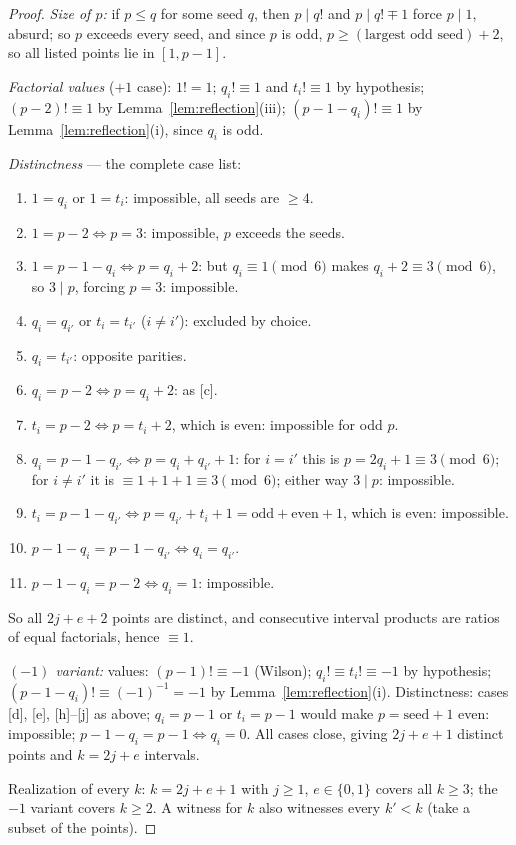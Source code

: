 \documentclass[11pt]{article}
\theoremstyle{definition}
\theoremstyle{remark}
\begin{document}
\begin{proof}
\emph{Size of $p$:} if $p \le q$ for some seed $q$, then $p \mid q!$ and
$p \mid q! \mp 1$ force $p \mid 1$, absurd; so $p$ exceeds every seed, and
since $p$ is odd, $p \ge (\text{largest odd seed}) + 2$, so all listed points
lie in $[1, p-1]$.

\emph{Factorial values} ($+1$ case): $1! = 1$; $q_i! \equiv 1$ and
$t_i! \equiv 1$ by hypothesis; $(p-2)! \equiv 1$ by
Lemma~\ref{lem:reflection}(iii); $(p-1-q_i)! \equiv 1$ by
Lemma~\ref{lem:reflection}(i), since $q_i$ is odd.

\emph{Distinctness} --- the complete case list:
\begin{enumerate}
  \item[{[a]}] $1 = q_i$ or $1 = t_i$: impossible, all seeds are $\ge 4$.
  \item[{[b]}] $1 = p-2 \iff p = 3$: impossible, $p$ exceeds the seeds.
  \item[{[c]}] $1 = p-1-q_i \iff p = q_i + 2$: but $q_i \equiv 1 \pmod 6$
    makes $q_i + 2 \equiv 3 \pmod 6$, so $3 \mid p$, forcing $p = 3$:
    impossible.
  \item[{[d]}] $q_i = q_{i'}$ or $t_i = t_{i'}$ ($i \ne i'$): excluded by
    choice.
  \item[{[e]}] $q_i = t_{i'}$: opposite parities.
  \item[{[f]}] $q_i = p-2 \iff p = q_i + 2$: as [c].
  \item[{[g]}] $t_i = p-2 \iff p = t_i + 2$, which is even: impossible for
    odd $p$.
  \item[{[h]}] $q_i = p-1-q_{i'} \iff p = q_i + q_{i'} + 1$: for $i = i'$
    this is $p = 2q_i + 1 \equiv 3 \pmod 6$; for $i \ne i'$ it is
    $\equiv 1 + 1 + 1 \equiv 3 \pmod 6$; either way $3 \mid p$: impossible.
  \item[{[i]}] $t_i = p-1-q_{i'} \iff p = q_{i'} + t_i + 1 =
    \text{odd} + \text{even} + 1$, which is even: impossible.
  \item[{[j]}] $p-1-q_i = p-1-q_{i'} \iff q_i = q_{i'}$.
  \item[{[k]}] $p-1-q_i = p-2 \iff q_i = 1$: impossible.
\end{enumerate}
So all $2j+e+2$ points are distinct, and consecutive interval products are
ratios of equal factorials, hence $\equiv 1$.

\emph{$(-1)$ variant:} values: $(p-1)! \equiv -1$ (Wilson);
$q_i! \equiv t_i! \equiv -1$ by hypothesis; $(p-1-q_i)! \equiv (-1)^{-1} =
-1$ by Lemma~\ref{lem:reflection}(i). Distinctness: cases [d], [e],
[h]--[j] as above;
$q_i = p-1$ or $t_i = p-1$ would make $p = \text{seed} + 1$ even:
impossible; $p-1-q_i = p-1 \iff q_i = 0$. All cases close, giving
$2j+e+1$ distinct points and $k = 2j+e$ intervals.

Realization of every $k$: $k = 2j+e+1$ with $j \ge 1$, $e \in \{0, 1\}$
covers all $k \ge 3$; the $-1$ variant covers $k \ge 2$. A witness for $k$
also witnesses every $k' < k$ (take a subset of the points).
\end{proof}
\end{document}
